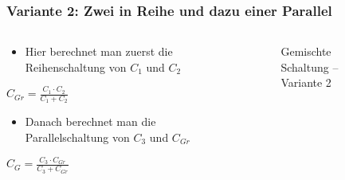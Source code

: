 \begin{frame}
\frametitle{Variante 2: Zwei in Reihe und dazu einer Parallel}
\begin{columns}
    \begin{column}{0.48\textwidth}
    \begin{itemize}
  \item Hier berechnet man zuerst die Reihenschaltung von $C_{ 1 }$ und $C_{ 2 }$
  \end{itemize}
$C_{ Gr } = \frac{ C_{ 1 } \cdot C_{ 2 } }{ C_{ 1 } + C_{ 2 }}$

\begin{itemize}
  \item Danach berechnet man die Parallelschaltung von $C_{ 3 }$ und $C_{ Gr }$
  \end{itemize}
$C_{ G } = \frac{ C_{ 3 } \cdot C_{ Gr } }{ C_{ 3 } + C_{ Gr }}$


    \end{column}
   \begin{column}{0.48\textwidth}
       
\begin{figure}
    \caption{\scriptsize Gemischte Schaltung -- Variante 2}
    \label{e_gemischt_variante_2}
\end{figure}


   \end{column}
\end{columns}

\end{frame}

\begin{frame}
\end{frame}%
